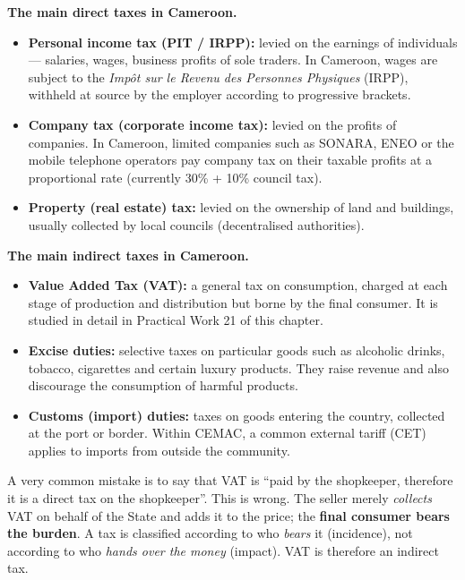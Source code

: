 \documentclass[11pt]{article}
\newcommand{\cle}[1]{{\popxbold\color{popdark}#1}}
\begin{document}
\textbf{The main direct taxes in Cameroon.}\par
\begin{itemize}
\item \textbf{Personal income tax (PIT / IRPP):} levied on the earnings of individuals --- salaries, wages, business profits of sole traders. In Cameroon, wages are subject to the \emph{Imp\^ot sur le Revenu des Personnes Physiques} (IRPP), withheld at source by the employer according to progressive brackets.
\item \textbf{Company tax (corporate income tax):} levied on the profits of companies. In Cameroon, limited companies such as SONARA, ENEO or the mobile telephone operators pay company tax on their taxable profits at a proportional rate (currently 30\% + 10\% council tax).
\item \textbf{Property (real estate) tax:} levied on the ownership of land and buildings, usually collected by local councils (decentralised authorities).
\end{itemize}

\textbf{The main indirect taxes in Cameroon.}\par
\begin{itemize}
\item \textbf{Value Added Tax (VAT):} a general tax on consumption, charged at each stage of production and distribution but borne by the final consumer. It is studied in detail in Practical Work 21 of this chapter.
\item \textbf{Excise duties:} selective taxes on particular goods such as alcoholic drinks, tobacco, cigarettes and certain luxury products. They raise revenue and also discourage the consumption of harmful products.
\item \textbf{Customs (import) duties:} taxes on goods entering the country, collected at the port or border. Within CEMAC, a common external tariff (CET) applies to imports from outside the community.
\end{itemize}

\begin{attention}
A very common mistake is to say that VAT is ``paid by the shopkeeper, therefore it is a direct tax on the shopkeeper''. This is wrong. The seller merely \emph{collects} VAT on behalf of the State and adds it to the price; the \textbf{final consumer bears the burden}. A tax is classified according to who \emph{bears} it (incidence), not according to who \emph{hands over the money} (impact). VAT is therefore an \cle{indirect tax}.
\end{attention}
\end{document}
